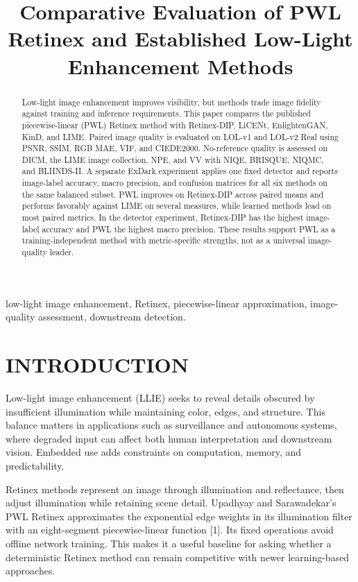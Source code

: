 \documentclass[conference]{IEEEtran}
\title{Comparative Evaluation of PWL Retinex and Established Low-Light Enhancement Methods}
\author{\IEEEauthorblockN{Toney Williams}}
\begin{document}
\maketitle

\begin{abstract}Low-light image enhancement improves visibility, but methods trade image fidelity against training and inference requirements. This paper compares the published piecewise-linear (PWL) Retinex method with Retinex-DIP, LiCENt, EnlightenGAN, KinD, and LIME. Paired image quality is evaluated on LOL-v1 and LOL-v2 Real using PSNR, SSIM, RGB MAE, VIF, and CIEDE2000. No-reference quality is assessed on DICM, the LIME image collection, NPE, and VV with NIQE, BRISQUE, NIQMC, and BLIINDS-II. A separate ExDark experiment applies one fixed detector and reports image-label accuracy, macro precision, and confusion matrices for all six methods on the same balanced subset. PWL improves on Retinex-DIP across paired means and performs favorably against LIME on several measures, while learned methods lead on most paired metrics. In the detector experiment, Retinex-DIP has the highest image-label accuracy and PWL the highest macro precision. These results support PWL as a training-independent method with metric-specific strengths, not as a universal image-quality leader.\end{abstract}

\begin{IEEEkeywords}low-light image enhancement, Retinex, piecewise-linear approximation, image-quality assessment, downstream detection.\end{IEEEkeywords}

\section{INTRODUCTION}

Low-light image enhancement (LLIE) seeks to reveal details obscured by insufficient illumination while maintaining color, edges, and structure. This balance matters in applications such as surveillance and autonomous systems, where degraded input can affect both human interpretation and downstream vision. Embedded use adds constraints on computation, memory, and predictability.

Retinex methods represent an image through illumination and reflectance, then adjust illumination while retaining scene detail. Upadhyay and Sarawadekar's PWL Retinex approximates the exponential edge weights in its illumination filter with an eight-segment piecewise-linear function [1]. Its fixed operations avoid offline network training. This makes it a useful baseline for asking whether a deterministic Retinex method can remain competitive with newer learning-based approaches.
\end{document}
